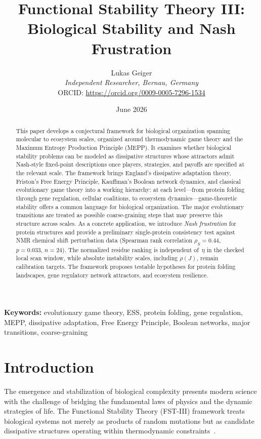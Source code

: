 \documentclass[12pt,a4paper]{article}
\title{Functional Stability Theory III: Biological Stability and Nash Frustration}
\author{Lukas Geiger\\
\textit{Independent Researcher, Bernau, Germany}\\
ORCID: \url{https://orcid.org/0009-0005-7296-1534}}
\date{June 2026}
\theoremstyle{remark}
\begin{document}
\maketitle

\begin{abstract}
This paper develops a conjectural framework for biological organization spanning molecular to ecosystem scales, organized around thermodynamic game theory and the Maximum Entropy Production Principle (MEPP). It examines whether biological stability problems can be modeled as dissipative structures whose attractors admit Nash-style fixed-point descriptions once players, strategies, and payoffs are specified at the relevant scale. The framework brings England's dissipative adaptation theory, Friston's Free Energy Principle, Kauffman's Boolean network dynamics, and classical evolutionary game theory into a working hierarchy: at each level---from protein folding through gene regulation, cellular coalitions, to ecosystem dynamics---game-theoretic stability offers a common language for biological organization. The major evolutionary transitions are treated as possible coarse-graining steps that may preserve this structure across scales. As a concrete application, we introduce \emph{Nash frustration} for protein structures and provide a preliminary single-protein consistency test against NMR chemical shift perturbation data (Spearman rank correlation $\rho_S = 0.44$, $p = 0.033$, $n = 24$). The normalized residue ranking is independent of~$\eta$ in the checked local scan window, while absolute instability scales, including $\rho(J)$, remain calibration targets. The framework proposes testable hypotheses for protein folding landscapes, gene regulatory network attractors, and ecosystem resilience.
\end{abstract}

\textbf{Keywords:} evolutionary game theory, ESS, protein folding, gene regulation, MEPP, dissipative adaptation, Free Energy Principle, Boolean networks, major transitions, coarse-graining

\clearpage
\tableofcontents
\clearpage

\section{Introduction}
\label{sec:introduction}

The emergence and stabilization of biological complexity presents modern science with the challenge of bridging the fundamental laws of physics and the dynamic strategies of life. The Functional Stability Theory (FST-III) framework treats biological systems not merely as products of random mutations but as candidate dissipative structures operating within thermodynamic constraints~\citep{EcosystemMEPP}.
\end{document}
